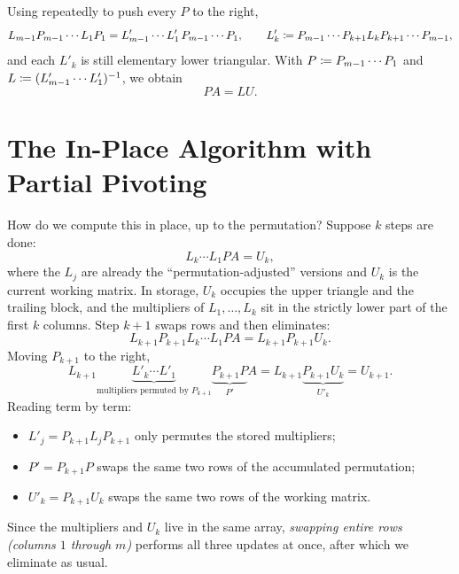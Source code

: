 Using  repeatedly to push every $P$ to the right,
\begin{equation}
  L_{m-1}P_{m-1} \cdots L_1P_1 = L'_{m-1} \cdots L'_1\,P_{m-1} \cdots P_1, \qquad L'_k \coloneqq P_{m-1} \cdots P_{k+1}L_kP_{k+1} \cdots P_{m-1},
\end{equation}
and each $L'_k$ is still elementary lower triangular. With $P \coloneqq P_{m-1} \cdots P_1$ and $L \coloneqq (L'_{m-1} \cdots L'_1)^{-1}$, we obtain
\begin{equation}
  PA = LU.
\end{equation}

\section{The In-Place Algorithm with Partial Pivoting}

How do we compute this in place, up to the permutation? Suppose $k$ steps are done:
\begin{equation}
  L_k \cdots L_1PA = U_k,
\end{equation}
where the $L_j$ are already the ``permutation-adjusted'' versions and $U_k$ is the current working matrix. In storage, $U_k$ occupies the upper triangle and the trailing block, and the multipliers of $L_1, \dots, L_k$ sit in the strictly lower part of the first $k$ columns. Step $k + 1$ swaps rows and then eliminates:
\begin{equation}
  L_{k+1}P_{k+1}L_k \cdots L_1PA = L_{k+1}P_{k+1}U_k.
\end{equation}
Moving $P_{k+1}$ to the right,
\begin{equation}
  L_{k+1}\underbrace{L'_k \cdots L'_1}_{\text{multipliers permuted by } P_{k+1}}\underbrace{P_{k+1}P}_{P'}A = L_{k+1}\underbrace{P_{k+1}U_k}_{U'_k} = U_{k+1}.
\end{equation}
Reading term by term:
\begin{itemize}
  \item $L'_j = P_{k+1}L_jP_{k+1}$ only permutes the stored multipliers;
  \item $P' = P_{k+1}P$ swaps the same two rows of the accumulated permutation;
  \item $U'_k = P_{k+1}U_k$ swaps the same two rows of the working matrix.
\end{itemize}
Since the multipliers and $U_k$ live in the same array, \emph{swapping entire rows (columns $1$ through $m$)} performs all three updates at once, after which we eliminate as usual.

